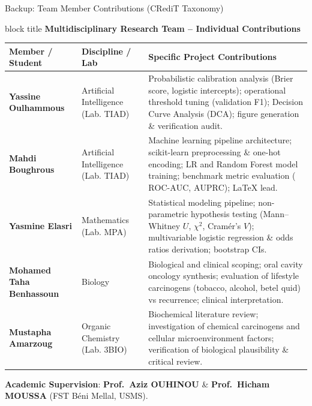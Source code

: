 \documentclass[10pt,aspectratio=169,xcolor={table,dvipsnames}]{beamer}
\newcommand{\ROC}{\text{ROC-AUC}}
\newcommand{\AUPRC}{\text{AUPRC}}
\begin{document}
\begin{frame}[noframenumbering]{Backup: Team Member Contributions (CRediT Taxonomy)}
  \begin{beamercolorbox}[sep=3pt,rounded=true,center]{block title}
    \textbf{Multidisciplinary Research Team -- Individual Contributions}
  \end{beamercolorbox}
  \vspace{0.15cm}

  \scriptsize
  \begin{tabular}{@{}p{2.8cm} p{2.6cm} p{9.0cm}@{}}
    \toprule
    \textbf{Member / Student} & \textbf{Discipline / Lab} & \textbf{Specific Project Contributions} \\
    \midrule
    \textbf{Yassine Oulhammous} & Artificial Intelligence \newline (Lab. TIAD) & Probabilistic calibration analysis (Brier score, logistic intercepts); operational threshold tuning (validation F1); Decision Curve Analysis (DCA); figure generation \& verification audit. \\
    \midrule
    \textbf{Mahdi Boughrous} & Artificial Intelligence \newline (Lab. TIAD) & Machine learning pipeline architecture; scikit-learn preprocessing \& one-hot encoding; LR and Random Forest model training; benchmark metric evaluation ($\ROC$, $\AUPRC$); \LaTeX{} lead. \\
    \midrule
    \textbf{Yasmine Elasri} & Mathematics \newline (Lab. MPA) & Statistical modeling pipeline; non-parametric hypothesis testing (Mann--Whitney $U$, $\chi^2$, Cramér's $V$); multivariable logistic regression \& odds ratios derivation; bootstrap CIs. \\
    \midrule
    \textbf{Mohamed Taha Benhassoun} & Biology & Biological and clinical scoping; oral cavity oncology synthesis; evaluation of lifestyle carcinogens (tobacco, alcohol, betel quid) vs recurrence; clinical interpretation. \\
    \midrule
    \textbf{Mustapha Amarzoug} & Organic Chemistry \newline (Lab. 3BIO) & Biochemical literature review; investigation of chemical carcinogens and cellular microenvironment factors; verification of biological plausibility \& critical review. \\
    \bottomrule
  \end{tabular}

  \vspace{0.15cm}
  {\tiny \textbf{Academic Supervision}: \textbf{Prof.~Aziz OUHINOU} \& \textbf{Prof.~Hicham MOUSSA} (FST Béni Mellal, USMS).}
\end{frame}
\end{document}
